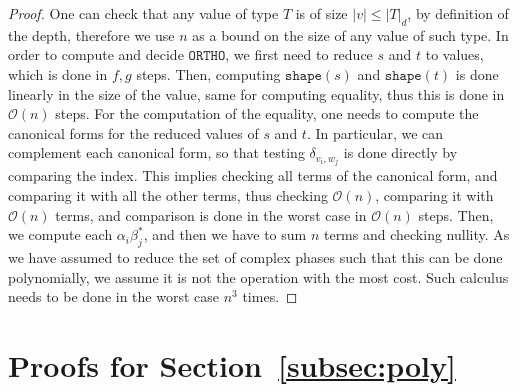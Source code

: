 \documentclass[10pt,a4paper]{article}
\newcommand{\shape}[1]{\mathtt{shape}(#1)}
\newcommand{\portho}{\mathtt{ORTHO}}
\newcommand\kron[2]{\delta_{#1, #2}}
\newcommand{\size}[1]{|#1|}
\newcommand{\mcal}{\mathcal}
\begin{document}
\begin{proof}
  One can check that any value of type $T$ is of size $\size v \leq \size T_d$,
  by definition of the depth, therefore we use $n$ as a bound on the size of
  any value of such type. In order to compute and decide $\portho$, we first
  need to reduce $s$ and $t$ to values, which is done in $f, g$ steps. Then,
  computing $\shape s$ and $\shape t$ is done linearly in the size of the
  value, same for computing equality, thus this is done in $\mcal O(n)$ steps.
  For the computation of the equality, one needs to compute the canonical forms
  for the reduced values of $s$ and $t$. In particular, we can complement each
  canonical form, so that testing $\kron{v_i}{w_j}$ is done directly by
  comparing the index. This implies checking all terms of the canonical form,
  and comparing it with all the other terms, thus checking $\mcal O(n)$,
  comparing it with $\mcal O(n)$ terms, and comparison is done in the worst
  case in $\mcal O(n)$ steps. Then, we compute each $\alpha_i \beta_j^*$, and
  then we have to sum $n$ terms and checking nullity. As we have assumed to
  reduce the set of complex phases such that this can be done polynomially, we
  assume it is not the operation with the most cost. Such calculus needs to be
  done in the worst case $n^3$ times.
\end{proof}


\section{Proofs for Section~\ref{subsec:poly}}

\circuitbound*
\end{document}
